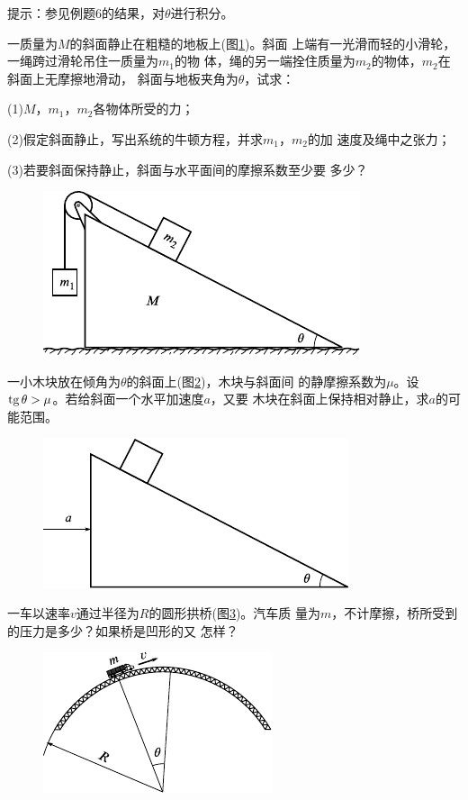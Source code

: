 \begin{exercises}
\lbr 提示：参见例题6的结果，对$ \theta $进行积分。\rbr

\exercise 一质量为$ M $的斜面静止在粗糙的地板上(图\ref{fig:03.41})。斜面
上端有一光滑而轻的小滑轮，一绳跨过滑轮吊住一质量为$ m_1 $的物
体，绳的另一端拴住质量为$ m_2 $的物体，$ m _ { 2 } $在斜面上无摩擦地滑动，
斜面与地板夹角为$ \theta $，试求：

(1)\;$ M $，$ m _ { 1 } $，$  m _ { 2 }  $各物体所受的力；

(2)假定斜面静止，写出系统的牛顿方程，并求$ m_1 $，$ m_2 $的加
速度及绳中之张力；

(3)若要斜面保持静止，斜面与水平面间的摩擦系数至少要
多少？

\begin{figure}[h]
  \centering
  \includegraphics{figure/fig03.41}
  \caption{}
  \label{fig:03.41}
  \vspace{-0.5em}
\end{figure}

\exercise 一小木块放在倾角为$ \theta $的斜面上(图\ref{fig:03.42})，木块与斜面间
的静摩擦系数为$ \mu $。设$  \operatorname{tg} \theta > \mu $。若给斜面一个水平加速度$ a $，又要
木块在斜面上保持相对静止，求$ a $的可能范围。
\begin{figure}[h]
  \centering
  \includegraphics{figure/fig03.42}
  \caption{}
  \label{fig:03.42}
  \vspace{-0.5em}
\end{figure}

\exercise 一车以速率$ v $通过半径为$ R $的圆形拱桥(图\ref{fig:03.43})。汽车质
量为$ m $，不计摩擦，桥所受到的压力是多少？如果桥是凹形的又
怎样？
\begin{figure}[h]
  \centering
  \includegraphics{figure/fig03.43}
  \caption{}
  \label{fig:03.43}
\end{figure}
\end{exercises}